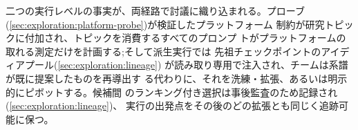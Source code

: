 二つの実行レベルの事実が、両経路で討議に織り込まれる。プローブ
(\cref{sec:exploration:platform-probe})が検証したプラットフォーム
制約が研究トピックに付加され、トピックを消費するすべてのプロンプ
トがプラットフォームの取れる測定だけを計画する;そして派生実行では
先祖チェックポイントのアイディアプール(\cref{sec:exploration:lineage})
が読み取り専用で注入され、チームは系譜が既に提案したものを再導出す
る代わりに、それを洗練・拡張、あるいは明示的にピボットする。候補間
のランキング付き選択は事後監査のため記録され(\cref{sec:exploration:lineage})、
実行の出発点をその後のどの拡張とも同じく追跡可能に保つ。
